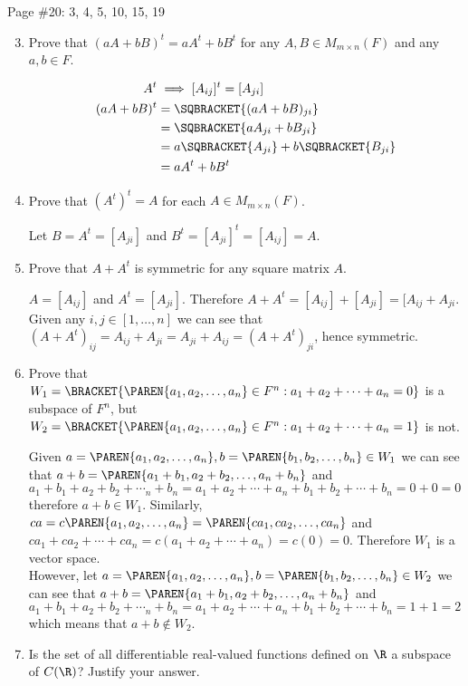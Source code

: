 \documentclass[10pt,a4paper]{report}
\newcommand{\MMN}{M_{m\times n}}
\begin{document}
Page \#20: 3, 4, 5, 10, 15, 19
\begin{enumerate}
	\setcounter{enumi}{2}
	\item Prove that $(aA+bB)^t = aA^t+bB^t$ for any $A,B\in \MMN(F)$ and any $a,b \in F$.
	
	\begin{align*}
		A^t &\implies [A_{ij}]^t = [A_{ji}] \\
		(aA+bB)^t &= \SQBRACKET{(aA + bB)_{ji}} \\
		 &= \SQBRACKET{ aA_{ji}+bB_{ji} } \\
		 &= a\SQBRACKET{A_{ji}}+b\SQBRACKET{B_{ji}} \\
		 &= aA^t + bB^t
	\end{align*}
	
	\item Prove that $(A^t)^t=A$ for each $A \in \MMN(F)$.
	
	Let $B = A^t = [A_{ji}]$ and $B^t = [A_{ji}]^t = [A_{ij}] = A$.
	
	\item Prove that $A+A^t$ is symmetric for any square matrix $A$.
	
	$A = [A_{ij}]$ and $A^t = [A_{ji}]$.  Therefore $A+A^t = [A_{ij}]+[A_{ji}]=[A_{ij}+A_{ji}$.  Given any $i, j \in [1, \dots, n]$ we can see that $(A+A^t)_{ij}=A_{ij}+A_{ji}=A_{ji}+A_{ij}=(A+A^t)_{ji}$, hence symmetric.
	
	\setcounter{enumi}{9}
	\item Prove that $W_1= \BRACKET{\PAREN{a_1,a_2,\dots, a_n} \in F^n: a_1+a_2+\cdots+a_n=0}$ is a subspace of $F^n$, but $W_2= \BRACKET{\PAREN{a_1,a_2,\dots, a_n} \in F^n: a_1+a_2+\cdots+a_n=1}$ is not.
	
	Given $a=\PAREN{a_1,a_2,\dots, a_n},b=\PAREN{b_1,b_2,\dots, b_n} \in W_1$ we can see that $a+b = \PAREN{a_1+b_1, a_2+b_2, \dots, a_n+b_n}$ and $a_1+b_1+a_2+b_2+\cdots_n+b_n = a_1+a_2+\cdots+a_n+b_1+b_2+\cdots+b_n=0+0=0$ therefore $a+b \in W_1$.  Similarly, $ca = c\PAREN{a_1,a_2,\dots, a_n}= \PAREN{ca_1,ca_2,\dots, ca_n}$ and $ca_1+ca_2+\cdots+ca_n= c(a_1+a_2+\cdots+a_n)=c(0)=0.$ Therefore $W_1$ is a vector space. \\
	However, let $a=\PAREN{a_1,a_2,\dots, a_n},b=\PAREN{b_1,b_2,\dots, b_n} \in W_2$ we can see that $a+b = \PAREN{a_1+b_1, a_2+b_2, \dots, a_n+b_n}$ and $a_1+b_1+a_2+b_2+\cdots_n+b_n = a_1+a_2+\cdots+a_n+b_1+b_2+\cdots+b_n=1+1=2$ which means that $a+b \not \in W_2$.
	\setcounter{enumi}{14}
	\item  Is the set of all differentiable real-valued functions defined on $\R$ a subspace of $C(\R)$?  Justify your answer.
	

\end{enumerate}
\end{document}
